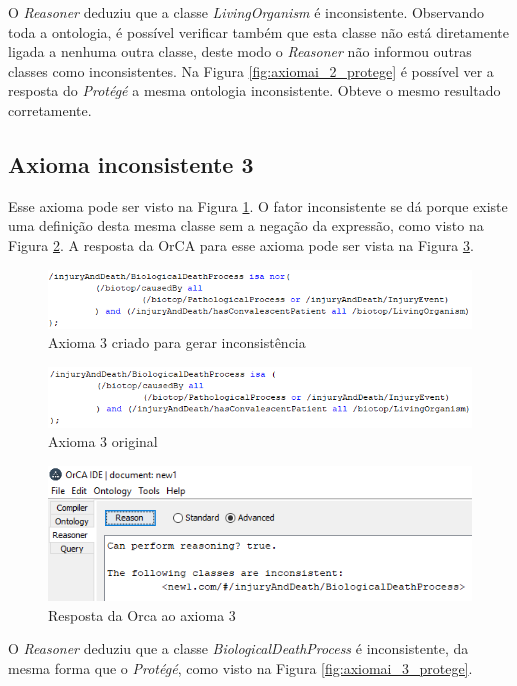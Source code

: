 \documentclass{bcc}
\begin{document}
O \textit{Reasoner} deduziu que a classe \textit{LivingOrganism} é inconsistente. Observando toda a ontologia, é possível verificar também que esta classe não está diretamente ligada a nenhuma outra classe, deste modo o \textit{Reasoner} não informou outras classes como inconsistentes. Na Figura \ref{fig:axiomai_2_protege} é possível ver a resposta do \textit{Protégé} a mesma ontologia inconsistente. Obteve o mesmo resultado corretamente.

\subsection{Axioma inconsistente 3}
Esse axioma pode ser visto na Figura \ref{fig:axiomai_3}. O fator inconsistente se dá porque existe uma definição desta mesma classe sem a negação da expressão, como visto na Figura \ref{fig:axiomai_3_o}. A resposta da OrCA para esse axioma pode ser vista na Figura \ref{fig:axiomai_3_res}.

\begin{figure}[H]
\centering
\includegraphics[width=.8\textwidth]{Figuras/axiomai_3.png}
\caption{Axioma 3 criado para gerar inconsistência} 
\label{fig:axiomai_3}
\end{figure}

\begin{figure}[H]
\centering
\includegraphics[width=.8\textwidth]{Figuras/axiomai_3_o.png}
\caption{Axioma 3 original} 
\label{fig:axiomai_3_o}
\end{figure}

\begin{figure}[H]
\centering
\includegraphics[width=.6\textwidth]{Figuras/axiomai_3_res.png}
\caption{Resposta da Orca ao axioma 3} 
\label{fig:axiomai_3_res}
\end{figure}

O \textit{Reasoner} deduziu que a classe \textit{BiologicalDeathProcess} é inconsistente, da mesma forma que o \textit{Protégé}, como visto na Figura \ref{fig:axiomai_3_protege}.
\end{document}
